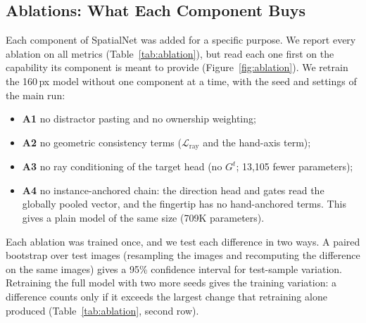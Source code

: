 \subsection{Ablations: What Each Component Buys}\label{sec:ablations}

Each component of SpatialNet was added for a specific purpose. We report every ablation on all metrics (Table~\ref{tab:ablation}), but read each one first on the capability its component is meant to provide (Figure~\ref{fig:ablation}). We retrain the 160\,px model without one component at a time, with the seed and settings of the main run:
\begin{itemize}
\item \textbf{A1} no distractor pasting and no ownership weighting;
\item \textbf{A2} no geometric consistency terms ($\mathcal{L}_{\mathrm{ray}}$ and the hand-axis term);
\item \textbf{A3} no ray conditioning of the target head (no $G^t$; 13,105 fewer parameters);
\item \textbf{A4} no instance-anchored chain: the direction head and gates read the globally pooled vector, and the fingertip has no hand-anchored terms. This gives a plain model of the same size (709K parameters).
\end{itemize}
Each ablation was trained once, and we test each difference in two ways. A paired bootstrap over test images (resampling the images and recomputing the difference on the same images) gives a 95\% confidence interval for test-sample variation. Retraining the full model with two more seeds gives the training variation: a difference counts only if it exceeds the largest change that retraining alone produced (Table~\ref{tab:ablation}, second row).

